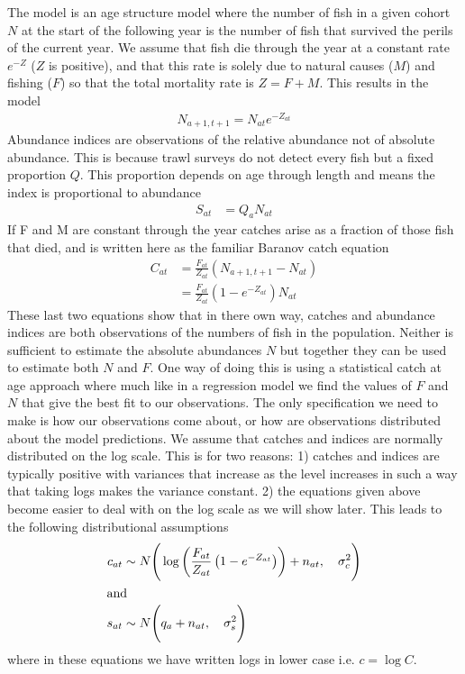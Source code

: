 \documentclass[a4paper,english]{article}
\begin{document}
The model is an age structure model where the number of fish in a given cohort $N$ at the start of the following year is the number of fish that survived the perils of the current year.  We assume that fish die through the year at a constant rate $e^{-Z}$ ($Z$ is positive), and that this rate is solely due to natural causes ($M$) and fishing ($F$) so that the total mortality rate is $Z = F + M$.  This results in the model
\begin{align*}
  N_{a+1,t+1} = N_{at} e^{- Z_{at}}
\end{align*}
Abundance indices are observations of the relative abundance not of absolute abundance.  This is because trawl surveys do not detect every fish but a fixed proportion $Q$. This proportion depends on age through length and means the index is proportional to abundance
\begin{align*}
  S_{at} &= Q_a N_{at}
\end{align*}
If F and M are constant through the year catches arise as a fraction of those fish that died, and is written here as the familiar Baranov catch equation
\begin{align*}
  C_{at} &= \frac{F_{at}}{Z_{at}}\left(N_{a+1,t+1} - N_{at} \right) \\
         &= \frac{F_{at}}{Z_{at}}\left(1 - e^{- Z_{at}}\right) N_{at}
\end{align*}
These last two equations show that in there own way, catches and abundance indices are both observations of the numbers of fish in the population.  Neither is sufficient to estimate the absolute abundances $N$ but together they can be used to estimate both $N$ and $F$.  One way of doing this is using a statistical catch at age approach  \citep[see for example][]{Myers_Cadigan.94} where much like in a regression model we find the values of $F$ and $N$ that give the best fit to our observations.  The only specification we need to make is how our observations come about, or how are observations distributed about the model predictions.  We assume that catches and indices are normally distributed on the log scale.  This is for two reasons: 1) catches and indices are typically positive with variances that increase as the level increases in such a way that taking logs makes the variance constant. 2) the equations given above become easier to deal with on the log scale as we will show later.  This leads to the following distributional assumptions
\begin{align*}
 c_{at} &\sim N \Bigg( \log \left( \frac{F_{at}}{Z_{at}} \left( 1 - e^{-Z_{at}} \right)\right) + n_{at}, \quad \sigma_c^2 \Bigg) \\
\intertext{and} 
 s_{at} &\sim N\Bigg( q_{a} + n_{at}, \quad \sigma_s^2 \Bigg)
\end{align*}  
where in these equations we have written logs in lower case i.e. $c = \log C$.
\end{document}
